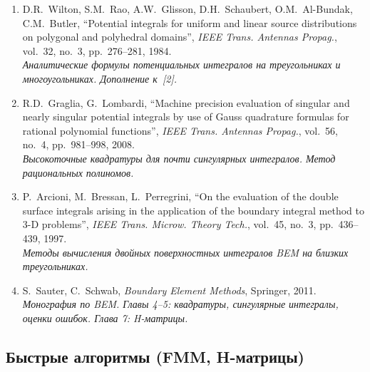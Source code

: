 \documentclass[12pt,a4paper]{article}
\begin{document}
\begin{enumerate}[resume]
  \item D.R.~Wilton, S.M.~Rao, A.W.~Glisson, D.H.~Schaubert, O.M.~Al-Bundak, C.M.~Butler, ``Potential integrals for uniform and linear source distributions on polygonal and polyhedral domains'', \textit{IEEE Trans. Antennas Propag.}, vol.~32, no.~3, pp.~276--281, 1984.
  \\ \textit{Аналитические формулы потенциальных интегралов на треугольниках и многоугольниках. Дополнение к~[2].}

  \item R.D.~Graglia, G.~Lombardi, ``Machine precision evaluation of singular and nearly singular potential integrals by use of Gauss quadrature formulas for rational polynomial functions'', \textit{IEEE Trans. Antennas Propag.}, vol.~56, no.~4, pp.~981--998, 2008.
  \\ \textit{Высокоточные квадратуры для почти сингулярных интегралов. Метод рациональных полиномов.}

  \item P.~Arcioni, M.~Bressan, L.~Perregrini, ``On the evaluation of the double surface integrals arising in the application of the boundary integral method to 3-D problems'', \textit{IEEE Trans. Microw. Theory Tech.}, vol.~45, no.~3, pp.~436--439, 1997.
  \\ \textit{Методы вычисления двойных поверхностных интегралов BEM на близких треугольниках.}

  \item S.~Sauter, C.~Schwab, \textit{Boundary Element Methods}, Springer, 2011.
  \\ \textit{Монография по BEM. Главы 4--5: квадратуры, сингулярные интегралы, оценки ошибок. Глава 7: H-матрицы.}
\end{enumerate}

\subsection{Быстрые алгоритмы (FMM, H-матрицы)}
\end{document}
